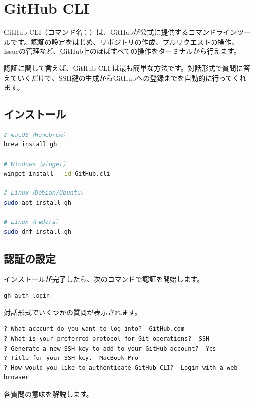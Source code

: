 \section{GitHub CLI}

GitHub CLI（コマンド名：）は、GitHubが公式に提供するコマンドラインツールです。認証の設定をはじめ、リポジトリの作成、プルリクエストの操作、Issueの管理など、GitHub上のほぼすべての操作をターミナルから行えます。

認証に関して言えば、GitHub CLI は最も簡単な方法です。対話形式で質問に答えていくだけで、SSH鍵の生成からGitHubへの登録までを自動的に行ってくれます。

\subsection{インストール}

\begin{lstlisting}[language=bash]
# macOS（Homebrew）
brew install gh

# Windows（winget）
winget install --id GitHub.cli

# Linux（Debian/Ubuntu）
sudo apt install gh

# Linux（Fedora）
sudo dnf install gh
\end{lstlisting}

\subsection{認証の設定}

インストールが完了したら、次のコマンドで認証を開始します。

\begin{lstlisting}[language=bash]
gh auth login
\end{lstlisting}

対話形式でいくつかの質問が表示されます。

\begin{lstlisting}[language={}]
? What account do you want to log into?  GitHub.com
? What is your preferred protocol for Git operations?  SSH
? Generate a new SSH key to add to your GitHub account?  Yes
? Title for your SSH key:  MacBook Pro
? How would you like to authenticate GitHub CLI?  Login with a web browser
\end{lstlisting}

各質問の意味を解説します。

